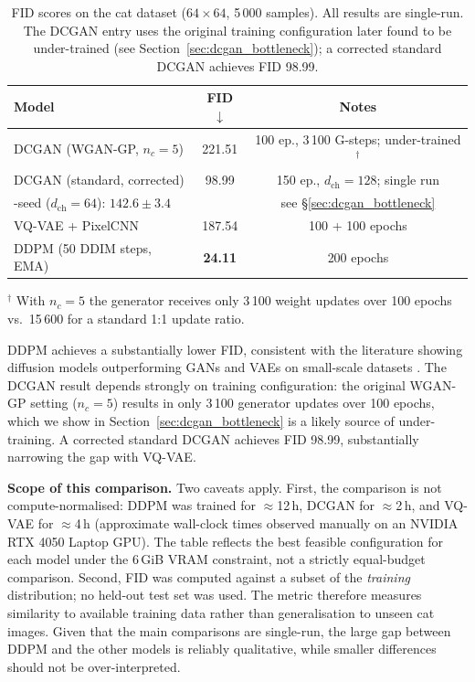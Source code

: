 \documentclass[12pt,a4paper]{article}
\begin{document}
\begin{table}[H]
  \centering
  \caption{FID scores on the cat dataset ($64\times64$, 5\,000 samples).
           All results are single-run.  The DCGAN entry uses the original
           training configuration later found to be under-trained (see
           Section~\ref{sec:dcgan_bottleneck}); a corrected standard DCGAN
           achieves FID 98.99.}
  \label{tab:fid}
  \begin{tabular}{lcc}
    \toprule
    Model & FID $\downarrow$ & Notes \\
    \midrule
    DCGAN (WGAN-GP, $n_c{=}5$) & 221.51 & 100 ep., 3\,100 G-steps; under-trained$^\dagger$ \\
    DCGAN (standard, corrected) & 98.99  & 150 ep., $d_\text{ch}=128$; single run \\
    \quad 3-seed ($d_\text{ch}=64$): $142.6 \pm 3.4$ & & see \S\ref{sec:dcgan_bottleneck} \\
    VQ-VAE + PixelCNN  & 187.54 & 100 + 100 epochs \\
    DDPM (50 DDIM steps, EMA) & \textbf{24.11} & 200 epochs \\
    \bottomrule
  \end{tabular}
  \begin{flushleft}
  \small $^\dagger$ With $n_c{=}5$ the generator receives only 3\,100 weight
  updates over 100 epochs vs.\ 15\,600 for a standard 1:1 update ratio.
  \end{flushleft}
\end{table}

DDPM achieves a substantially lower FID, consistent with the literature
showing diffusion models outperforming GANs and VAEs on small-scale datasets
\cite{diffusionbeatsgan}.  The DCGAN result depends strongly on training
configuration: the original WGAN-GP setting ($n_c=5$) results in only
3\,100 generator updates over 100 epochs, which we show in
Section~\ref{sec:dcgan_bottleneck} is a likely source of under-training.
A corrected standard DCGAN achieves FID 98.99, substantially narrowing the
gap with VQ-VAE.

\textbf{Scope of this comparison.}
Two caveats apply.  First, the comparison is not compute-normalised: DDPM was
trained for $\approx$12\,h, DCGAN for $\approx$2\,h, and VQ-VAE for $\approx$4\,h
(approximate wall-clock times observed manually on an NVIDIA RTX 4050 Laptop GPU).
The table reflects the best feasible configuration for each model under the
6\,GiB VRAM constraint, not a strictly equal-budget comparison.  Second, FID was
computed against a subset of the \emph{training} distribution; no held-out test
set was used.  The metric therefore measures similarity to available training
data rather than generalisation to unseen cat images.  Given that the main
comparisons are single-run, the large gap between DDPM and the other models is
reliably qualitative, while smaller differences should not be over-interpreted.
\end{document}
